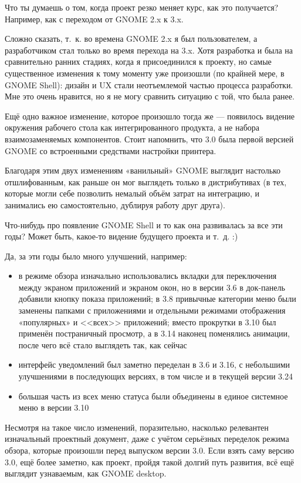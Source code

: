 \documentclass[10pt, a5paper]{article}
\begin{document}
\begin{Parallel}[p]{}{}
{\q Что ты думаешь о том, когда проект резко меняет курс, как это получается? Например, как с переходом от GNOME 2.x к 3.x. 

\a Сложно сказать, т.~к. во времена GNOME 2.x я был пользователем, а разработчиком стал только во время перехода на 3.x. Хотя разработка и была на сравнительно ранних стадиях, когда я присоединился к проекту, но самые существенное изменения к тому моменту уже произошли (по крайней мере, в GNOME Shell): дизайн и UX стали неотъемлемой частью процесса разработки. Мне это очень нравится, но я не могу сравнить ситуацию с той, что была ранее.

Ещё одно важное изменение, которое произошло тогда же — появилось видение окружения рабочего стола как интегрированного продукта, а не набора взаимозаменяемых компонентов. Стоит напомнить, что 3.0 была первой версией GNOME со встроенными средствами настройки принтера.

Благодаря этим двух изменениям «ванильный» GNOME выглядит настолько отшлифованным, как раньше он мог выглядеть только в дистрибутивах (в тех, которые могли себе позволить немалый объём затрат на интеграцию, и занимались ею самостоятельно, дублируя работу друг друга).

\q Что-нибудь про появление GNOME Shell и то как она развивалась за все эти годы? Может быть, какое-то видение будущего проекта и т.~д. :)

\a Да, за эти годы было много улучшений, например:
\begin{itemize}
\item в режиме обзора изначально использовались вкладки для переключения между экраном приложений и экраном окон, но в версии 3.6 в док-панель добавили кнопку показа приложений; в 3.8 привычные категории меню были заменены папками с приложениями и отдельными режимами отображения «популярных» и <<всех>> приложений; вместо прокрутки в 3.10 был применён постраничный просмотр, а в 3.14 наконец поменялись анимации, после чего всё стало выглядеть так, как сейчас

\item интерфейс уведомлений был заметно переделан в 3.6 и 3.16, с небольшими улучшениями в последующих версиях, в том числе и в текущей версии 3.24

\item большая часть из всех меню статуса были объединены в единое системное меню в версии 3.10
\end{itemize}

Несмотря на такое число изменений, поразительно, насколько релевантен изначальный проектный документ\fakefootnote{}, даже с учётом серьёзных переделок режима обзора, которые произошли перед выпуском версии 3.0. Если взять саму версию 3.0\fakefootnote{}, ещё более заметно, как проект, пройдя такой долгий путь развития, всё ещё выглядит узнаваемым, как GNOME desktop.

}
\end{Parallel}
\end{document}
